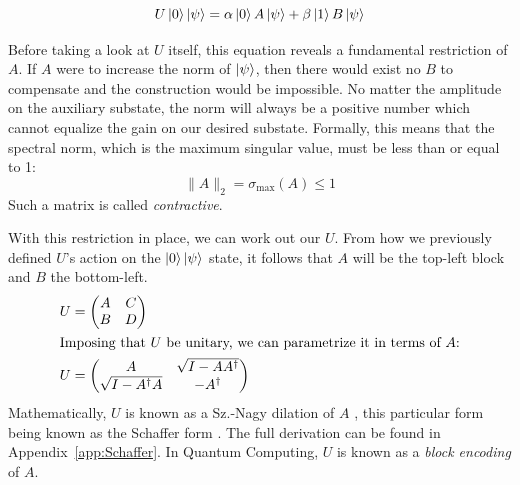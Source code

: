 \begin{equation*}
    U\ket{0}\ket{\psi} = \alpha\ket{0}A\ket{\psi} + \beta\ket{1}B\ket{\psi}
\end{equation*}

Before taking a look at $U$ itself, this equation reveals a fundamental restriction of $A$.
If $A$ were to increase the norm of $\ket{\psi}$, then there would exist no $B$ to compensate and the construction would be impossible. 
No matter the amplitude on the auxiliary substate, the norm will always be a positive number which cannot equalize the gain on our desired substate.
Formally, this means that the spectral norm, which is the maximum singular value, must be less than or equal to 1:
\begin{equation*}
    \|A\|_2 = \sigma_{\max}(A) \le 1
\end{equation*}
Such a matrix is called \emph{contractive}.

With this restriction in place, we can work out our $U$. From how we previously defined $U$'s action on the $\ket{0}\ket{\psi}$ state, it follows that $A$ will be the top-left block and $B$ the bottom-left.
\begin{align*}
    U &= \begin{pmatrix} A & C \\ B & D \end{pmatrix} \\
    \intertext{Imposing that $U$ be unitary, we can parametrize it in terms of $A$:}
    U &= \begin{pmatrix} A & \sqrt{I - A A^\dagger} \\ \sqrt{I - A^\dagger A} & -A^\dagger \end{pmatrix}
\end{align*}
Mathematically, $U$ is known as a Sz.-Nagy dilation of $A$ \cite{szHokefalvi1954contractions}, this particular form being known as the Schaffer form \cite{schaffer1955unitary}.
The full derivation can be found in Appendix~\ref{app:Schaffer}.
In Quantum Computing, $U$ is known as a \emph{block encoding} of $A$.

